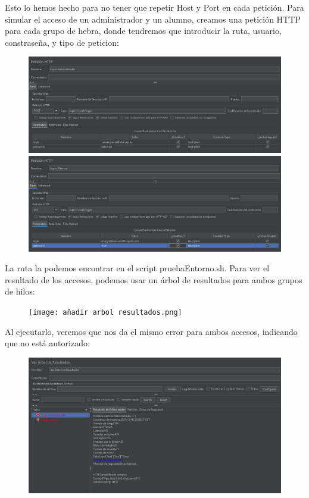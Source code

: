 \documentclass[a4paper]{article}
\begin{document}
\newline Esto lo hemos hecho para no tener que repetir Host y Port en cada petición.
Para simular el acceso de un administrador y un alumno, creamos una petición HTTP para
cada grupo de hebra, donde tendremos que introducir la ruta, usuario, constraseña, y tipo de peticion:
\begin{figure}[hbt!]
    \includegraphics[width=\textwidth]{login administrador.png}
    \includegraphics[width=\textwidth]{login alumno.png}
\end{figure}
\newpage
La ruta la podemos encontrar en el script pruebaEntorno.sh.
Para ver el resultado de los accesos, podemos usar un árbol de resultados para ambos
grupos de hilos:
\begin{figure}[hbt!]
    \texttt{[image: añadir arbol resultados.png]}
\end{figure}
\newline Al ejecutarlo, veremos que nos da el mismo error para ambos accesos, indicando 
que no está autorizado:
\begin{figure}[hbt!]
    \includegraphics[width=\textwidth]{errores arbol resultados.png}
\end{figure}
\end{document}
